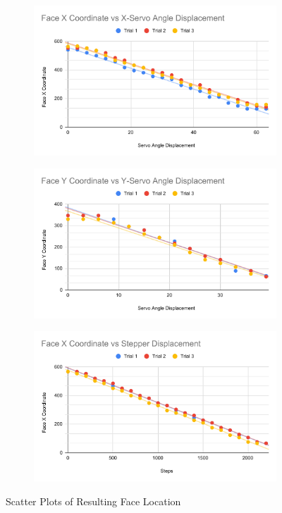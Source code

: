 \begin{figure}[h]
    \centering
    \begin{subfigure}{0.475\linewidth}
    \includegraphics[width=\linewidth]{Thesis/ch5/Face X Coordinate vs X-Servo Angle Displacement.pdf}
    \end{subfigure}
    \begin{subfigure}{0.475\linewidth}
    \includegraphics[width=\linewidth]{Thesis/ch5/Face Y Coordinate vs Y-Servo Angle Displacement.pdf}
    \end{subfigure}
    \begin{subfigure}{0.475\linewidth}
    \includegraphics[width=\linewidth]{Thesis/ch5/Face X Coordinate vs Stepper Displacement.pdf}
    \end{subfigure}
    \caption{Scatter Plots of Resulting Face Location}
    \label{fig:scatter}
\end{figure}

